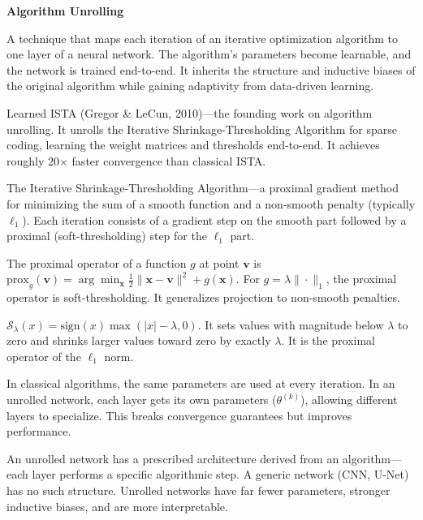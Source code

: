 \documentclass[11pt, letterpaper]{article}
\begin{document}
\vspace{0.8em}
{\large\bfseries\sffamily\color{SectionBlue} Algorithm Unrolling}\par\vspace{0.2em}

{A technique that maps each iteration of an iterative optimization algorithm to one layer of a neural network.  The algorithm's parameters become learnable, and the network is trained end-to-end.  It inherits the structure and inductive biases of the original algorithm while gaining adaptivity from data-driven learning.}

{Learned ISTA (Gregor \& LeCun, 2010)---the founding work on algorithm unrolling.  It unrolls the Iterative Shrinkage-Thresholding Algorithm for sparse coding, learning the weight matrices and thresholds end-to-end.  It achieves roughly 20$\times$ faster convergence than classical ISTA.}

{The Iterative Shrinkage-Thresholding Algorithm---a proximal gradient method for minimizing the sum of a smooth function and a non-smooth penalty (typically $\ell_1$).  Each iteration consists of a gradient step on the smooth part followed by a proximal (soft-thresholding) step for the $\ell_1$ part.}

{The proximal operator of a function $g$ at point $\mathbf{v}$ is $\text{prox}_g(\mathbf{v}) = \arg\min_{\mathbf{x}} \frac{1}{2}\|\mathbf{x} - \mathbf{v}\|^2 + g(\mathbf{x})$.  For $g = \lambda\|\cdot\|_1$, the proximal operator is soft-thresholding.  It generalizes projection to non-smooth penalties.}

{$\mathcal{S}_\lambda(x) = \text{sign}(x)\max(|x| - \lambda, 0)$.  It sets values with magnitude below $\lambda$ to zero and shrinks larger values toward zero by exactly $\lambda$.  It is the proximal operator of the $\ell_1$ norm.}

{In classical algorithms, the same parameters are used at every iteration.  In an unrolled network, each layer gets its own parameters ($\theta^{(k)}$), allowing different layers to specialize.  This breaks convergence guarantees but improves performance.}

{An unrolled network has a prescribed architecture derived from an algorithm---each layer performs a specific algorithmic step.  A generic network (CNN, U-Net) has no such structure.  Unrolled networks have far fewer parameters, stronger inductive biases, and are more interpretable.}
\end{document}
